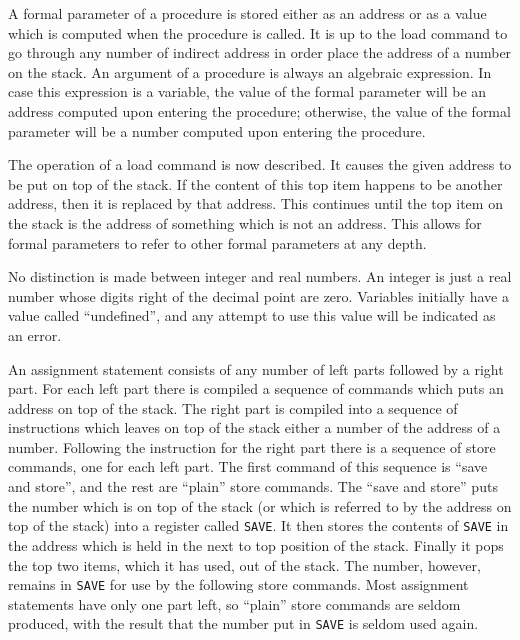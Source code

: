 \documentclass[notitlepage,twocolumn]{report}
\begin{document}
A formal parameter of a procedure is stored either as an address or as
a value which is computed when the procedure is called. It is up to
the load command to go through any number of indirect address in order
place the address of a number on the stack. An argument of a procedure
is always an algebraic expression. In case this expression is a
variable, the value of the formal parameter will be an address
computed upon entering the procedure; otherwise, the value of the
formal parameter will be a number computed upon entering the
procedure.

The operation of a load command is now described. It causes the given
address to be put on top of the stack. If the content of this top item
happens to be another address, then it is replaced by that
address. This continues until the top item on the stack is the address
of something which is not an address. This allows for formal
parameters to refer to other formal parameters at any depth.

No distinction is made between integer and real numbers. An integer is
just a real number whose digits right of the decimal point are
zero. Variables initially have a value called ``undefined'', and any
attempt to use this value will be indicated as an error.

An assignment statement consists of any number of left parts followed
by a right part. For each left part there is compiled a sequence of
commands which puts an address on top of the stack. The right part is
compiled into a sequence of instructions which leaves on top of the
stack either a number of the address of a number. Following the
instruction for the right part there is a sequence of store commands,
one for each left part. The first command of this sequence is ``save
and store'', and the rest are ``plain'' store commands. The ``save and
store'' puts the number which is on top of the stack (or which is
referred to by the address on top of the stack) into a register called
\texttt{SAVE}. It then stores the contents of \texttt{SAVE} in the
address which is held in the next to top position of the
stack. Finally it pops the top two items, which it has used, out of
the stack. The number, however, remains in \texttt{SAVE} for use by
the following store commands. Most assignment statements have only one
part left, so ``plain'' store commands are seldom produced, with the
result that the number put in \texttt{SAVE} is seldom used again.

\end{document}
